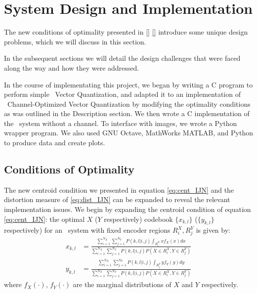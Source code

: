 \section{System Design and Implementation}
The new conditions of optimality presented in \eqref{} \eqref{} introduce some unique design problems, which we will discuss in this section.

In the subsequent sections we will detail the design challenges that were faced along the way and how they were addressed.

In the course of implementating this project, we began by writing a C program to perform simple \sysII\ Vector Quantization, and adapted it to an implementation of \sysIIN\ Channel-Optimized Vector Quantization by modifying the optimality conditions as was outlined in the Description section. We then wrote a C implementation of the \sysIJ\ system without a channel. To interface with images, we wrote a Python wrapper program. We also used GNU Octave, MathWorks MATLAB, and Python to produce data and create plots.

\subsection{Conditions of Optimality}
The new centroid condition we presented in equation \eqref{eq:cent_IJN} and the distortion measure of \eqref{eq:dist_IJN} can be expanded to reveal the relevant implementation issues. We begin by expanding the centroid condition of equation \eqref{eq:cent_IJN}: the optimal $X$ ($Y$ respectively) codebook $\{x_{k,l}\}$ ($\{y_{k,l}\}$ respectively) for an \sysIJN\ system with fixed encoder regions $R_i^X, R_j^Y$ is given by:
\begin{align}
    \label{eq:int_cent_IJN_x}
    x_{k,l}
    &= \frac{
        \sum_{i=1}^{N_X}\sum_{j=1}^{N_Y}
            P(k,l|i,j)\int_{R_i^X}xf_X(x)dx
    }{
        \sum_{i=1}^{N_X}\sum_{j=1}^{N_Y}
            P(k,l|i,j)P(X\in R_i^X, Y\in R_j^Y)
    }\\
    \label{eq:int_cent_IJN_y}
    y_{k,l}
    &= \frac{
        \sum_{i=1}^{N_X}\sum_{j=1}^{N_Y}
            P(k,l|i,j)\int_{R_j^Y}yf_Y(y)dy
    }{
        \sum_{i=1}^{N_X}\sum_{j=1}^{N_Y}
            P(k,l|i,j)P(X\in R_i^X, Y\in R_j^Y)
    }
\end{align}
where $f_X(\cdot)$, $f_Y(\cdot)$ are the marginal distributions of $X$ and $Y$ respectively.

